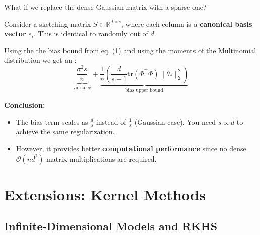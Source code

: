 \documentclass[
11pt,notheorems,hyperref={pdfauthor=whatever}
]{beamer}
\begin{document}
\begin{frame}
    What if we replace the dense Gaussian matrix with a sparse one? 

    Consider a sketching matrix \(S \in \mathbb{R}^{d \times s}\), where each column is a \alert{\textbf{canonical basis vector}} \(e_i\). This is identical to randomly  out of \(d\).

    Using the the bias bound from eq. (1) and using the moments of the Multinomial distribution we get an :
    \[
        \underbrace{\frac{\sigma^2 s}{n}}_{\text{variance}} + \underbrace{\frac{1}{n} \left( \frac{d}{s-1} \text{tr}(\Phi^\top\Phi) \|\theta_*\|_2^2 \right)}_{\text{bias upper bound}}
    \]

    \textbf{Conclusion:}
    \begin{itemize}
        \item The bias term scales as \(\frac{d}{s}\) instead of \(\frac{1}{s}\) (Gaussian case). You need \(s \propto d\) to achieve the same regularization.
        \item However, it provides better \alert{\textbf{computational performance}} since no dense \(\mathcal{O}(nd^2)\) matrix multiplications are required.
    \end{itemize}
\end{frame}


\section{Extensions: Kernel Methods}

\subsection{Infinite-Dimensional Models and RKHS}
\end{document}
